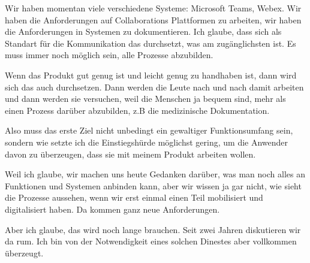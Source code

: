 Wir haben momentan viele verschiedene Systeme: Microsoft Teams, Webex. Wir haben die Anforderungen auf Collaborations Plattformen zu arbeiten, wir haben die Anforderungen in Systemen zu dokumentieren. Ich glaube, dass sich als Standart für die Kommunikation das durchsetzt, was am zugänglichsten ist. Es muss immer noch möglich sein, alle Prozesse abzubilden.

Wenn das Produkt gut genug ist und leicht genug zu handhaben ist, dann wird sich das auch durchsetzen. Dann werden die Leute nach und nach damit arbeiten und dann werden sie versuchen, weil die Menschen ja bequem sind, mehr als einen Prozess darüber abzubilden, z.B die medizinische Dokumentation.

Also muss das erste Ziel nicht unbedingt ein gewaltiger Funktionsumfang sein, sondern wie setzte ich  die Einstiegshürde möglichst gering, um die Anwender davon zu überzeugen, dass sie mit meinem Produkt arbeiten wollen.

Weil ich glaube, wir machen uns heute Gedanken darüber, was man noch alles an Funktionen und Systemen anbinden kann, aber wir wissen ja gar nicht, wie sieht die Prozesse aussehen, wenn wir erst einmal einen Teil mobilisiert und digitalisiert haben. Da kommen ganz neue Anforderungen. 

Aber ich glaube, das wird noch lange brauchen. Seit zwei Jahren diskutieren wir da rum. Ich bin von der Notwendigkeit eines solchen Dinestes aber vollkommen überzeugt.